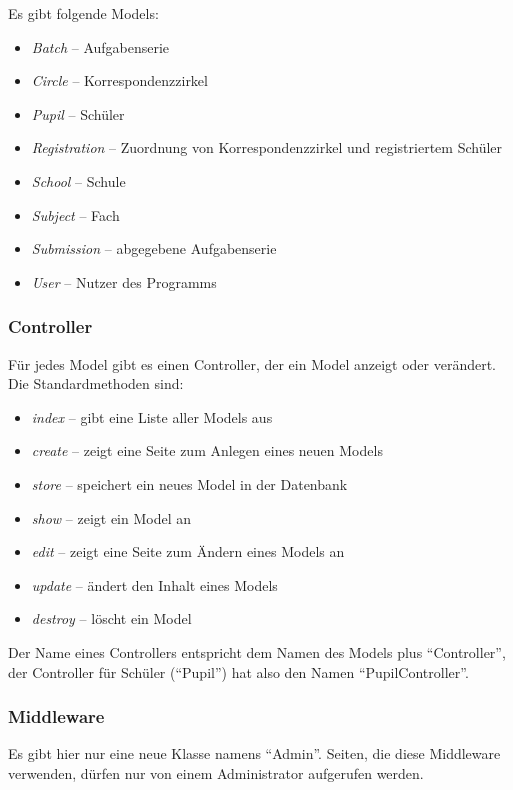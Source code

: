 Es gibt folgende Models:

\begin{itemize}
	\item \textit{Batch} -- Aufgabenserie
	\item \textit{Circle} -- Korrespondenzzirkel
	\item \textit{Pupil} -- Schüler
	\item \textit{Registration} -- Zuordnung von Korrespondenzzirkel und registriertem Schüler
	\item \textit{School} -- Schule
	\item \textit{Subject} -- Fach
	\item \textit{Submission} -- abgegebene Aufgabenserie
	\item \textit{User} -- Nutzer des Programms
\end{itemize}

\subsubsection{Controller}

Für jedes Model gibt es einen Controller, der ein Model anzeigt oder verändert. Die Standardmethoden sind:

\begin{itemize}
	\item \textit{index} -- gibt eine Liste aller Models aus
	\item \textit{create} -- zeigt eine Seite zum Anlegen eines neuen Models
	\item \textit{store} -- speichert ein neues Model in der Datenbank
	\item \textit{show} -- zeigt ein Model an
	\item \textit{edit} -- zeigt eine Seite zum Ändern eines Models an
	\item \textit{update} -- ändert den Inhalt eines Models
	\item \textit{destroy} -- löscht ein Model
\end{itemize}

Der Name eines Controllers entspricht dem Namen des Models plus "`Controller"', der Controller für Schüler ("`Pupil"') hat also den Namen "`PupilController"'.

\subsubsection{Middleware}

Es gibt hier nur eine neue Klasse namens "`Admin"'. Seiten, die diese Middleware verwenden, dürfen nur von einem Administrator aufgerufen werden.

